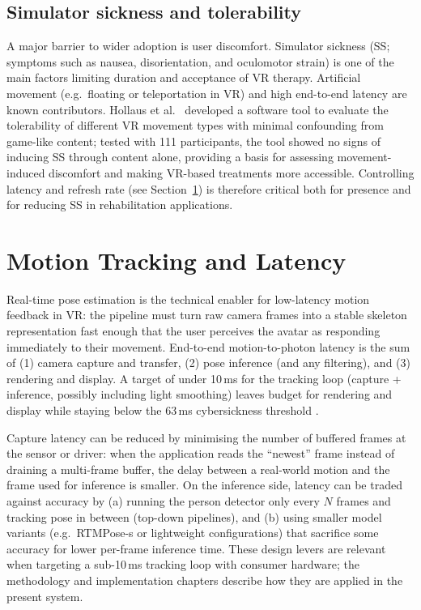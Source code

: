 \subsection{Simulator sickness and tolerability}

A major barrier to wider adoption is user discomfort. Simulator sickness (SS; symptoms such as nausea, disorientation, and oculomotor strain) is one of the main factors limiting duration and acceptance of VR therapy. Artificial movement (e.g.\ floating or teleportation in VR) and high end-to-end latency are known contributors. Hollaus et al.\ \cite{Hollaus.2024} developed a software tool to evaluate the tolerability of different VR movement types with minimal confounding from game-like content; tested with 111 participants, the tool showed no signs of inducing SS through content alone, providing a basis for assessing movement-induced discomfort and making VR-based treatments more accessible. Controlling latency and refresh rate (see Section~\ref{sec:latency}) is therefore critical both for presence and for reducing SS in rehabilitation applications.

\section{Motion Tracking and Latency}
\label{sec:latency}

Real-time pose estimation is the technical enabler for low-latency motion feedback in VR: the pipeline must turn raw camera frames into a stable skeleton representation fast enough that the user perceives the avatar as responding immediately to their movement. End-to-end motion-to-photon latency is the sum of (1) camera capture and transfer, (2) pose inference (and any filtering), and (3) rendering and display. A target of under 10\,ms for the tracking loop (capture + inference, possibly including light smoothing) leaves budget for rendering and display while staying below the 63\,ms cybersickness threshold \cite{caserman2019latency}.

Capture latency can be reduced by minimising the number of buffered frames at the sensor or driver: when the application reads the ``newest'' frame instead of draining a multi-frame buffer, the delay between a real-world motion and the frame used for inference is smaller. On the inference side, latency can be traded against accuracy by (a) running the person detector only every $N$ frames and tracking pose in between (top-down pipelines), and (b) using smaller model variants (e.g.\ RTMPose-s or lightweight configurations) that sacrifice some accuracy for lower per-frame inference time. These design levers are relevant when targeting a sub-10\,ms tracking loop with consumer hardware; the methodology and implementation chapters describe how they are applied in the present system.

